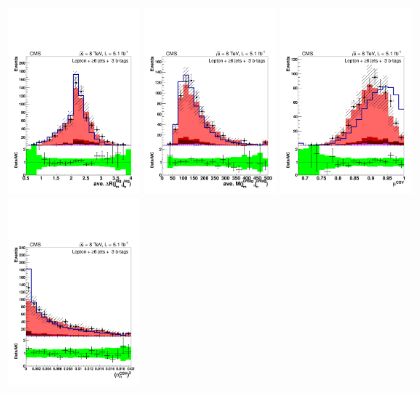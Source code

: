 \begin{figure}[hbtp]
 \begin{center}
   \includegraphics[width=0.31\textwidth]{Figures/Analysis_1_Diagrams/d2MCPlots_avg_dr_tagged_jets_cut6_jge6_t3_Combined_HtWgt.pdf}
   \includegraphics[width=0.31\textwidth]{Figures/Analysis_1_Diagrams/d2MCPlots_avg_untagged_dijet_mass_cut6_jge6_t3_Combined_HtWgt.pdf}
   \includegraphics[width=0.31\textwidth]{Figures/Analysis_1_Diagrams/d2MCPlots_avg_btag_disc_btags_cut6_jge6_t3_Combined_HtWgt.pdf}
   \includegraphics[width=0.31\textwidth]{Figures/Analysis_1_Diagrams/d2MCPlots_dev_from_avg_disc_btags_cut6_jge6_t3_Combined_HtWgt.pdf}

\end{center}
\end{figure}
